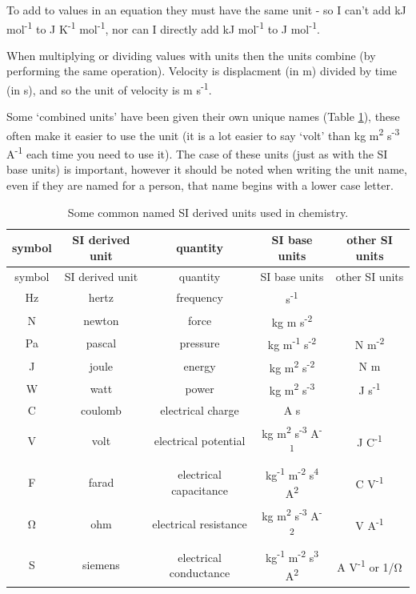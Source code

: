 \documentclass[
]{book}
\begin{document}
To add to values in an equation they must have the same unit - so I can't add kJ mol\textsuperscript{-1} to J K\textsuperscript{-1} mol\textsuperscript{-1}, nor can I directly add kJ mol\textsuperscript{-1} to J mol\textsuperscript{-1}.

When multiplying or dividing values with units then the units combine (by performing the same operation). Velocity is displacment (in m) divided by time (in s), and so the unit of velocity is m s\textsuperscript{-1}.

Some `combined units' have been given their own unique names (Table \ref{tab:SIderive}), these often make it easier to use the unit (it is a lot easier to say `volt' than kg m\textsuperscript{2} s\textsuperscript{-3} A\textsuperscript{-1} each time you need to use it). The case of these units (just as with the SI base units) is important, however it should be noted when writing the unit name, even if they are named for a person, that name begins with a lower case letter.

\begin{longtable}[]{@{}ccccc@{}}
\caption{\label{tab:SIderive} Some common named SI derived units used in chemistry.}\tabularnewline
\toprule
symbol & SI derived unit & quantity & SI base units & other SI units\tabularnewline
\midrule
\endfirsthead
\toprule
symbol & SI derived unit & quantity & SI base units & other SI units\tabularnewline
\midrule
\endhead
Hz & hertz & frequency & s\textsuperscript{-1} &\tabularnewline
N & newton & force & kg m s\textsuperscript{-2} &\tabularnewline
Pa & pascal & pressure & kg m\textsuperscript{-1} s\textsuperscript{-2} & N m\textsuperscript{-2}\tabularnewline
J & joule & energy & kg m\textsuperscript{2} s\textsuperscript{-2} & N m\tabularnewline
W & watt & power & kg m\textsuperscript{2} s\textsuperscript{-3} & J s\textsuperscript{-1}\tabularnewline
C & coulomb & electrical charge & A s &\tabularnewline
V & volt & electrical potential & kg m\textsuperscript{2} s\textsuperscript{-3} A\textsuperscript{-1} & J C\textsuperscript{-1}\tabularnewline
F & farad & electrical capacitance & kg\textsuperscript{-1} m\textsuperscript{-2} s\textsuperscript{4} A\textsuperscript{2} & C V\textsuperscript{-1}\tabularnewline
Ω & ohm & electrical resistance & kg m\textsuperscript{2} s\textsuperscript{-3} A\textsuperscript{-2} & V A\textsuperscript{-1}\tabularnewline
S & siemens & electrical conductance & kg\textsuperscript{-1} m\textsuperscript{-2} s\textsuperscript{3} A\textsuperscript{2} & A V\textsuperscript{-1} or 1/Ω\tabularnewline
\bottomrule
\end{longtable}
\end{document}
